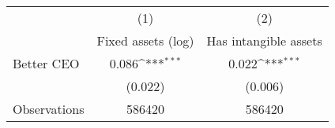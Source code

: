 {
\def\sym#1{\ifmmode^{#1}\else\(^{#1}\)\fi}
\begin{tabular}{l*{2}{c}}
\hline\hline
                    &\multicolumn{1}{c}{(1)}&\multicolumn{1}{c}{(2)}\\
                    &\multicolumn{1}{c}{Fixed assets (log)}&\multicolumn{1}{c}{Has intangible assets}\\
\hline
Better CEO          &       0.086\sym{***}&       0.022\sym{***}\\
                    &     (0.022)         &     (0.006)         \\
\hline
Observations        &      586420         &      586420         \\
\hline\hline
\end{tabular}
}
